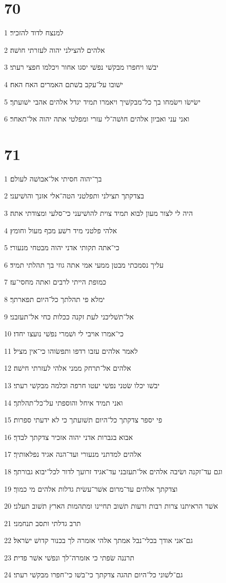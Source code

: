 \chapter{70}

\par 1 למנצח לדוד להזכיר׃
\par 2 אלהים להצילני יהוה לעזרתי חושׁה׃
\par 3 יבשׁו ויחפרו מבקשׁי נפשׁי יסגו אחור ויכלמו חפצי רעתי׃
\par 4 ישׁובו על־עקב בשׁתם האמרים האח האח׃
\par 5 ישׂישׂו וישׂמחו בך כל־מבקשׁיך ויאמרו תמיד יגדל אלהים אהבי ישׁועתך׃
\par 6 ואני עני ואביון אלהים חושׁה־לי עזרי ומפלטי אתה יהוה אל־תאחר׃

\chapter{71}

\par 1 בך־יהוה חסיתי אל־אבושׁה לעולם׃
\par 2 בצדקתך תצילני ותפלטני הטה־אלי אזנך והושׁיעני׃
\par 3 היה לי לצור מעון לבוא תמיד צוית להושׁיעני כי־סלעי ומצודתי אתה׃
\par 4 אלהי פלטני מיד רשׁע מכף מעול וחומץ׃
\par 5 כי־אתה תקותי אדני יהוה מבטחי מנעורי׃
\par 6 עליך נסמכתי מבטן ממעי אמי אתה גוזי בך תהלתי תמיד׃
\par 7 כמופת הייתי לרבים ואתה מחסי־עז׃
\par 8 ימלא פי תהלתך כל־היום תפארתך׃
\par 9 אל־תשׁליכני לעת זקנה ככלות כחי אל־תעזבני׃
\par 10 כי־אמרו אויבי לי ושׁמרי נפשׁי נועצו יחדו׃
\par 11 לאמר אלהים עזבו רדפו ותפשׂוהו כי־אין מציל׃
\par 12 אלהים אל־תרחק ממני אלהי לעזרתי חישׁה׃
\par 13 יבשׁו יכלו שׂטני נפשׁי יעטו חרפה וכלמה מבקשׁי רעתי׃
\par 14 ואני תמיד איחל והוספתי על־כל־תהלתך׃
\par 15 פי יספר צדקתך כל־היום תשׁועתך כי לא ידעתי ספרות׃
\par 16 אבוא בגברות אדני יהוה אזכיר צדקתך לבדך׃
\par 17 אלהים למדתני מנעורי ועד־הנה אגיד נפלאותיך׃
\par 18 וגם עד־זקנה ושׂיבה אלהים אל־תעזבני עד־אגיד זרועך לדור לכל־יבוא גבורתך׃
\par 19 וצדקתך אלהים עד־מרום אשׁר־עשׂית גדלות אלהים מי כמוך׃
\par 20 אשׁר הראיתנו צרות רבות ורעות תשׁוב תחיינו ומתהמות הארץ תשׁוב תעלני׃
\par 21 תרב גדלתי ותסב תנחמני׃
\par 22 גם־אני אודך בכלי־נבל אמתך אלהי אזמרה לך בכנור קדושׁ ישׂראל׃
\par 23 תרננה שׂפתי כי אזמרה־לך ונפשׁי אשׁר פדית׃
\par 24 גם־לשׁוני כל־היום תהגה צדקתך כי־בשׁו כי־חפרו מבקשׁי רעתי׃

